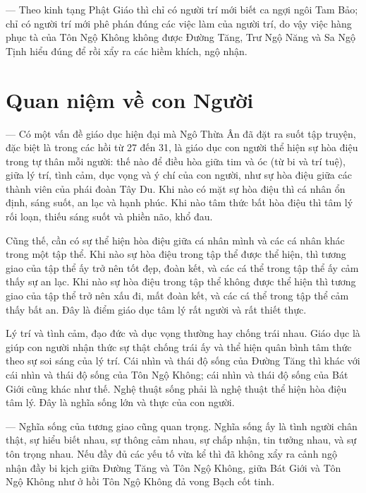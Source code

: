— Theo kinh tạng Phật Giáo thì chỉ có người trí mới biết ca ngợi ngôi Tam Bảo; chỉ có người trí mới phê phán đúng các việc làm của người trí, do vậy việc hàng phục tà của Tôn Ngộ Không không được Đường Tăng, Trư Ngộ Năng và Sa Ngộ Tịnh hiểu đúng để rồi xẩy ra các hiềm khích, ngộ nhận.

\section{Quan niệm về con Người} %
\label{sec:27_28_con_nguoi}

— Có một vấn đề giáo dục hiện đại mà Ngô Thừa Ân đã đặt ra suốt tập truyện, đặc biệt là trong các hồi từ 27 đến 31, là giáo dục con người thể hiện sự hòa điệu trong tự thân mỗi người: thế nào để điều hòa giữa tim và óc (từ bi và trí tuệ), giữa lý trí, tình cảm, dục vọng và ý chí của con người, như sự hòa điệu giữa các thành viên của phái đoàn Tây Du. Khi nào có mặt sự hòa điệu thì cá nhân ổn định, sáng suốt, an lạc và hạnh phúc. Khi nào tâm thức bất hòa điệu thì tâm lý rối loạn, thiếu sáng suốt và phiền não, khổ đau.

Cũng thế, cần có sự thể hiện hòa điệu giữa cá nhân mình và các cá nhân khác trong một tập thể. Khi nào sự hòa điệu trong tập thể được thể hiện, thì tương giao của tập thể ấy trở nên tốt đẹp, đoàn kết, và các cá thể trong tập thể ấy cảm thấy sự an lạc. Khi nào sự hòa điệu trong tập thể không được thể hiện thì tương giao của tập thể trở nên xấu đi, mất đoàn kết, và các cá thể trong tập thể cảm thấy bất an. Đây là điểm giáo dục tâm lý rất người và rất thiết thực.

Lý trí và tình cảm, đạo đức và dục vọng thường hay chống trái nhau. Giáo dục là giúp con người nhận thức sự thật chống trái ấy và thể hiện quân bình tâm thức theo sự soi sáng của lý trí. Cái nhìn và thái độ sống của Đường Tăng thì khác với cái nhìn và thái độ sống của Tôn Ngộ Không; cái nhìn và thái độ sống của Bát Giới cũng khác như thế. Nghệ thuật sống phải là nghệ thuật thể hiện hòa điệu tâm lý. Đây là nghĩa sống lớn và thực của con người.

— Nghĩa sống của tương giao cũng quan trọng. Nghĩa sống ấy là tình người chân thật, sự hiểu biết nhau, sự thông cảm nhau, sự chấp nhận, tin tưởng nhau, và sự tôn trọng nhau. Nếu đầy đủ các yếu tố vừa kể thì đã không xẩy ra cảnh ngộ nhận đầy bi kịch giữa Đường Tăng và Tôn Ngộ Không, giữa Bát Giới và Tôn Ngộ Không như ở hồi Tôn Ngộ Không đả vong Bạch cốt tinh.

